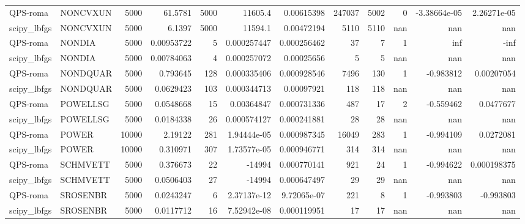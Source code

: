 \documentclass[a4paper]{article}
\begin{document}
\begin{tabular}{llrrrrrrrrrr}
	QPS-roma    & NONCVXUN &  5000 & 61.5781     &   5000 &  11605.4         & 0.00615398  &   247037 &     5002 &        0 &  -3.38664e-05 &    2.26271e-05 \\
	scipy\_lbfgs & NONCVXUN &  5000 &  6.1397     &   5000 &  11594.1         & 0.00472194  &     5110 &     5110 &      nan & nan           &  nan           \\
	QPS-roma    & NONDIA   &  5000 &  0.00953722 &      5 &      0.000257447 & 0.000256462 &       37 &        7 &        1 & inf           & -inf           \\
	scipy\_lbfgs & NONDIA   &  5000 &  0.00784063 &      4 &      0.000257072 & 0.00025656  &        5 &        5 &      nan & nan           &  nan           \\
	QPS-roma    & NONDQUAR &  5000 &  0.793645   &    128 &      0.000335406 & 0.000928546 &     7496 &      130 &        1 &  -0.983812    &    0.00207054  \\
	scipy\_lbfgs & NONDQUAR &  5000 &  0.0629423  &    103 &      0.000344713 & 0.00097921  &      118 &      118 &      nan & nan           &  nan           \\
	QPS-roma    & POWELLSG &  5000 &  0.0548668  &     15 &      0.00364847  & 0.000731336 &      487 &       17 &        2 &  -0.559462    &    0.0477677   \\
	scipy\_lbfgs & POWELLSG &  5000 &  0.0184338  &     26 &      0.000574127 & 0.000241881 &       28 &       28 &      nan & nan           &  nan           \\
	QPS-roma    & POWER    & 10000 &  2.19122    &    281 &      1.94444e-05 & 0.000987345 &    16049 &      283 &        1 &  -0.994109    &    0.0272081   \\
	scipy\_lbfgs & POWER    & 10000 &  0.310971   &    307 &      1.73577e-05 & 0.000946771 &      314 &      314 &      nan & nan           &  nan           \\
	QPS-roma    & SCHMVETT &  5000 &  0.376673   &     22 & -14994           & 0.000770141 &      921 &       24 &        1 &  -0.994622    &    0.000198375 \\
	scipy\_lbfgs & SCHMVETT &  5000 &  0.0506403  &     27 & -14994           & 0.000647497 &       29 &       29 &      nan & nan           &  nan           \\
	QPS-roma    & SROSENBR &  5000 &  0.0243247  &      6 &      2.37137e-12 & 9.72065e-07 &      221 &        8 &        1 &  -0.993803    &   -0.993803    \\
	scipy\_lbfgs & SROSENBR &  5000 &  0.0117712  &     16 &      7.52942e-08 & 0.000119951 &       17 &       17 &      nan & nan           &  nan           \\

\end{tabular}
\end{document}
